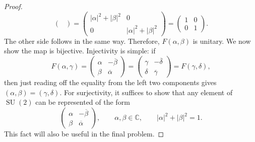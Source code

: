 \documentclass[11pt, letterpaper]{article}
\theoremstyle{plain}
\begin{document}
\begin{proof}
\[\begin{pmatrix}
		\end{pmatrix}=\begin{pmatrix}
		\left| \alpha  \right| ^2+\left| \beta  \right| ^2 & 0 \\
		0 & \left| \alpha  \right| ^2+\left| \beta  \right| ^2
		\end{pmatrix}=\begin{pmatrix}
		1 & 0 \\
		0 & 1
		\end{pmatrix}
	.\]
	The other side follows in the same way. Therefore, $F(\alpha ,\beta )$ is unitary. We now show the map is bijective. Injectivity is simple: if
	\[
		F(\alpha ,\gamma )=\begin{pmatrix}
		\alpha  & - \overline{\beta }  \\
		\beta  & \overline{\alpha } 
		\end{pmatrix}= \begin{pmatrix}
		\gamma  & - \overline{\delta }  \\
		\delta  & \overline{\gamma } 
		\end{pmatrix}=F(\gamma ,\delta )
	,\]
	then just reading off the equality from the left two components gives $(\alpha ,\beta )=(\gamma ,\delta )$. For surjectivity, it suffices to show that any element of $\operatorname{SU} (2)$ can be represented of the form
	\[
		\begin{pmatrix}
		\alpha  & - \overline{\beta }  \\
		\beta  & \overline{\alpha } 
		\end{pmatrix},\qquad \alpha ,\beta \in\mathbb{C} ,\qquad \left| \alpha  \right| ^2+\left| \beta  \right| ^2=1
	.\]
	This fact will also be useful in the final problem.


\end{proof}
\end{document}
